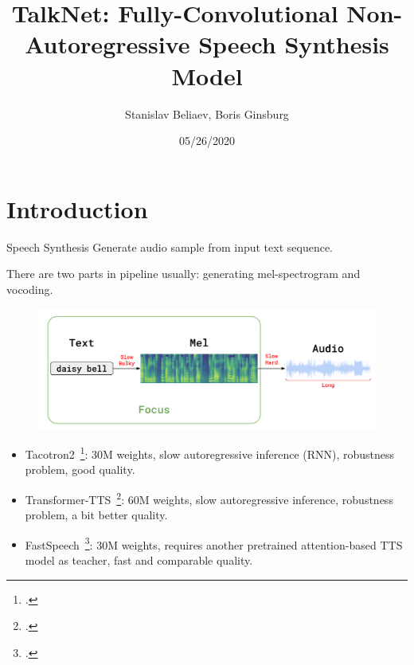 

\title[Speech Synthesis]{TalkNet: Fully-Convolutional Non-Autoregressive Speech Synthesis Model}
\author[Stanislav Beliaev]{Stanislav Beliaev, Boris Ginsburg}
\date{05/26/2020}



\begin{frame}
\titlepage
\end{frame}

\section{Introduction}

\begin{frame}
\begin{block}{Speech Synthesis}
Generate audio sample from input text sequence.
\end{block}
There are two parts in pipeline usually: generating mel-spectrogram and vocoding.
\begin{figure}[H]
\centering
\includegraphics[width=1.0\textwidth]{images/tts-pipeline.png}
\end{figure}
\end{frame}

\begin{frame}
\begin{itemize}
    \item Tacotron2~\footcite{tacotron2}: 30M weights, slow autoregressive inference (RNN), robustness problem, good quality.
    \item Transformer-TTS~\footcite{transformer-tts}: 60M weights, slow autoregressive inference, robustness problem, a bit better quality.
    \item FastSpeech~\footcite{fastspeech}: 30M weights, requires another pretrained attention-based TTS model as teacher, fast and comparable quality.
\end{itemize}
\end{frame}

